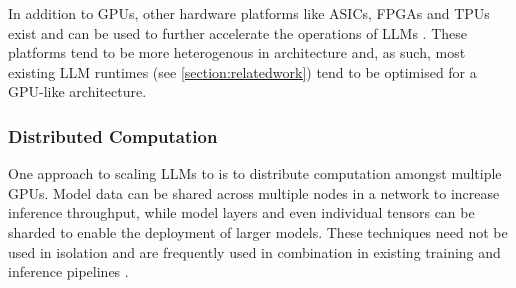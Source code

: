\documentclass[12pt,twoside]{report}
\begin{document}
In addition to GPUs, other hardware platforms like ASICs, FPGAs and TPUs exist and can be used to further accelerate the operations of LLMs \cite{li2024large}.
These platforms tend to be more heterogenous in architecture and, as such, most existing LLM runtimes (see \ref{section:relatedwork}) tend to be optimised for a GPU-like architecture.

\subsubsection{Distributed Computation}
One approach to scaling LLMs to is to distribute computation amongst multiple GPUs. 
Model data can be shared across multiple nodes in a network to increase inference throughput, while model layers and even individual tensors can be sharded to enable the deployment of larger models.
These techniques need not be used in isolation and are frequently used in combination in existing training and inference pipelines \cite{kwon2023efficient} \cite{shoeybi2019megatron} \cite{yu2022orca}.
\end{document}
